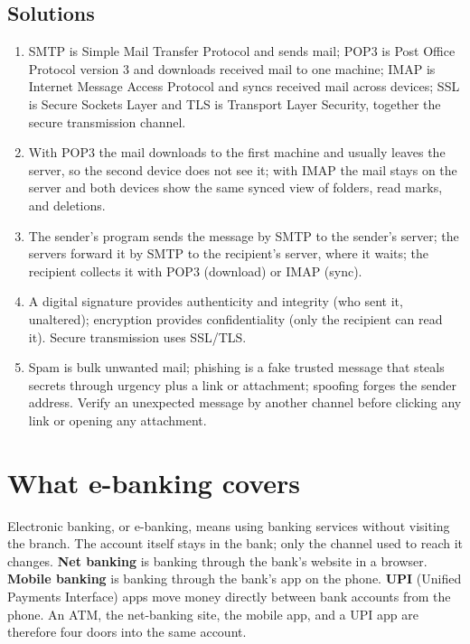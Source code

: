 \subsection*{Solutions}
\begingroup\small
\begin{enumerate}[label=\arabic*.]
  \item SMTP is Simple Mail Transfer Protocol and sends mail; POP3 is Post
    Office Protocol version 3 and downloads received mail to one machine;
    IMAP is Internet Message Access Protocol and syncs received mail across
    devices; SSL is Secure Sockets Layer and TLS is Transport Layer
    Security, together the secure transmission channel.
  \item With POP3 the mail downloads to the first machine and usually
    leaves the server, so the second device does not see it; with IMAP the
    mail stays on the server and both devices show the same synced view of
    folders, read marks, and deletions.
  \item The sender's program sends the message by SMTP to the sender's
    server; the servers forward it by SMTP to the recipient's server, where
    it waits; the recipient collects it with POP3 (download) or IMAP
    (sync).
  \item A digital signature provides authenticity and integrity (who sent
    it, unaltered); encryption provides confidentiality (only the recipient
    can read it). Secure transmission uses SSL/TLS.
  \item Spam is bulk unwanted mail; phishing is a fake trusted message
    that steals secrets through urgency plus a link or attachment;
    spoofing forges the sender address. Verify an unexpected message by
    another channel before clicking any link or opening any attachment.
\end{enumerate}
\endgroup

\section{What e-banking covers}
Electronic banking, or e-banking, means using banking services without
visiting the branch. The account itself stays in the bank; only the channel
used to reach it changes. \textbf{Net banking} is banking through the bank's
website in a browser. \textbf{Mobile banking} is banking through the bank's
app on the phone. \textbf{UPI} (Unified Payments Interface) apps move money
directly between bank accounts from the phone. An ATM, the net-banking site,
the mobile app, and a UPI app are therefore four doors into the same
account.

